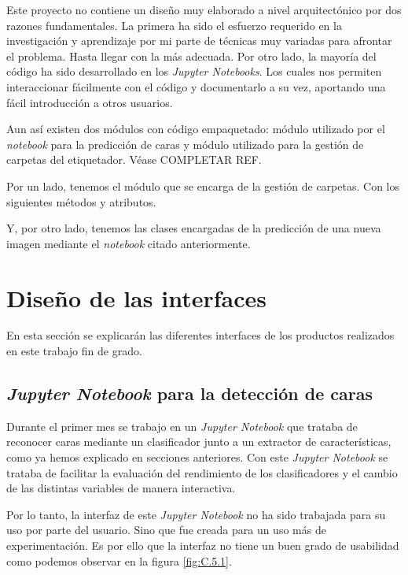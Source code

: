 Este proyecto no contiene un diseño muy elaborado a nivel arquitectónico por dos razones fundamentales. La primera ha sido el esfuerzo requerido en la investigación y aprendizaje por mi parte de técnicas muy variadas para afrontar el problema. Hasta llegar con la más adecuada. Por otro lado, la mayoría del código ha sido desarrollado en los \textit{Jupyter Notebooks}. Los cuales nos permiten interaccionar fácilmente con el código y documentarlo a su vez, aportando una fácil introducción a otros usuarios.

Aun así existen dos módulos con código empaquetado: módulo utilizado por el \textit{notebook} para la predicción de caras y módulo utilizado para la gestión de carpetas del etiquetador. Véase COMPLETAR REF.



Por un lado, tenemos el módulo que se encarga de la gestión de carpetas. Con los siguientes métodos y atributos.

Y, por otro lado, tenemos las clases encargadas de la predicción de una nueva imagen mediante el \textit{notebook} citado anteriormente.



\section{Diseño de las interfaces}

En esta sección se explicarán las diferentes interfaces de los productos realizados en este trabajo fin de grado.

\subsection{\textit{Jupyter Notebook} para la detección de caras}

Durante el primer mes se trabajo en un \textit{Jupyter Notebook} que trataba de reconocer caras mediante un clasificador junto a un extractor de características, como ya hemos explicado en secciones anteriores. Con este \textit{Jupyter Notebook} se trataba de facilitar la evaluación del rendimiento de los clasificadores y el cambio de las distintas variables de manera interactiva. 

Por lo tanto, la interfaz de este \textit{Jupyter Notebook} no ha sido trabajada para su uso por parte del usuario. Sino que fue creada para un uso más de experimentación. Es por ello que la interfaz no tiene un buen grado de usabilidad como podemos observar en la figura \ref{fig:C.5.1}.


